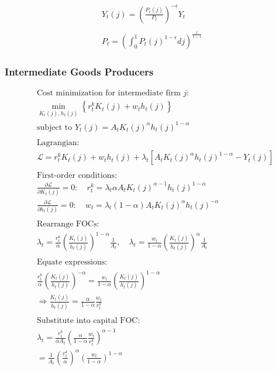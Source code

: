 \documentclass[11pt,preprint]{elsarticle}
\numberwithin{equation}{section}
\numberwithin{figure}{section}
\numberwithin{table}{section}
\begin{document}
\begin{equation}\label{demand_and_price}  
\boxed{  
  \begin{gathered}  
  Y_t(j) = \left( \frac{P_t(j)}{P_t} \right)^{-\epsilon} Y_t \\  
  \\  
  P_t = \left( \int_0^1 P_t(j)^{1-\epsilon}  dj \right)^{\frac{1}{1-\epsilon}}  
  \end{gathered}  
}  
\end{equation}

\subsubsection{\texorpdfstring{Intermediate Goods Producers
\label{intermediate_good_producer_appendix}}{Intermediate Goods Producers }}\label{intermediate-goods-producers-1}

\begin{align*}
& \text{Cost minimization for intermediate firm } j: \\
& \min_{K_t(j), h_t(j)} \left\{ r_t^k K_t(j) + w_t h_t(j) \right\} \\
& \text{subject to } Y_t(j) = A_t K_t(j)^{\alpha} h_t(j)^{1-\alpha} \\
& \\
& \text{Lagrangian:} \\
& \mathcal{L} = r_t^k K_t(j) + w_t h_t(j) + \lambda_t \left[ A_t K_t(j)^{\alpha} h_t(j)^{1-\alpha} - Y_t(j) \right] \\
& \\
& \text{First-order conditions:} \\
& \frac{\partial \mathcal{L}}{\partial K_t(j)} = 0: \quad r_t^k = \lambda_t \alpha A_t K_t(j)^{\alpha-1} h_t(j)^{1-\alpha} \\
& \frac{\partial \mathcal{L}}{\partial h_t(j)} = 0: \quad w_t = \lambda_t (1-\alpha) A_t K_t(j)^{\alpha} h_t(j)^{-\alpha} \\
& \\
& \text{Rearrange FOCs:} \\
& \lambda_t = \frac{r_t^k}{\alpha} \left( \frac{K_t(j)}{h_t(j)} \right)^{1-\alpha} \frac{1}{A_t}, \quad 
\lambda_t = \frac{w_t}{1-\alpha} \left( \frac{K_t(j)}{h_t(j)} \right)^{\alpha} \frac{1}{A_t} \\
& \\
& \text{Equate expressions:} \\
& \frac{r_t^k}{\alpha} \left( \frac{K_t(j)}{h_t(j)} \right)^{-\alpha} = \frac{w_t}{1-\alpha} \left( \frac{K_t(j)}{h_t(j)} \right)^{1-\alpha} \\
& \Rightarrow \frac{K_t(j)}{h_t(j)} = \frac{\alpha}{1-\alpha} \frac{w_t}{r_t^k} \\
& \\
& \text{Substitute into capital FOC:} \\
& \lambda_t = \frac{r_t^k}{\alpha A_t} \left( \frac{\alpha}{1-\alpha} \frac{w_t}{r_t^k} \right)^{\alpha-1} \\
& = \frac{1}{A_t} \left( \frac{r_t^k}{\alpha} \right)^{\alpha} \left( \frac{w_t}{1-\alpha} \right)^{1-\alpha}
\end{align*}
\end{document}
